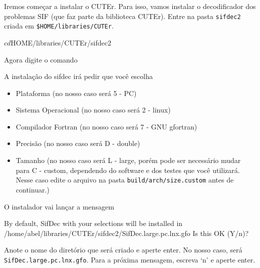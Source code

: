 \documentclass[letterpaper,11pt]{article}
\numberwithin{equation}{section}
\begin{document}
Iremos começar a instalar o CUTEr. Para isso, vamos instalar o decodificador
dos problemas SIF (que faz parte da biblioteca CUTEr).
Entre na pasta \verb+sifdec2+ criada em \verb+$HOME/libraries/CUTEr+.
\begin{terminal}
$ cd $HOME/libraries/CUTEr/sifdec2
\end{terminal}
Agora digite o comando
A instalação do sifdec irá pedir que você escolha
\begin{itemize}
 \item Plataforma (no nosso caso será 5 - PC)
 \item Sistema Operacional (no nosso caso será 2 - linux)
 \item Compilador Fortran (no nosso caso será 7 - GNU gfortran)
 \item Precisão (no nosso caso será D - double)
 \item Tamanho (no nosso caso será L - large, porém pode ser necessário mudar para C - custom,
dependendo do software e dos testes que você utilizará. Nesse caso edite o arquivo na pasta
\verb+build/arch/size.custom+ antes de continuar.)
\end{itemize}
O instalador vai lançar a mensagem
\begin{terminal}
 By default, SifDec with your selections will be installed in
  /home/abel/libraries/CUTEr/sifdec2/SifDec.large.pc.lnx.gfo
 Is this OK (Y/n)?
\end{terminal}
Anote o nome do diretório que será criado e aperte enter. No nosso caso, será \\
 \verb+SifDec.large.pc.lnx.gfo+. Para a próxima mensagem, escreva `n' e aperte enter.
\end{document}
